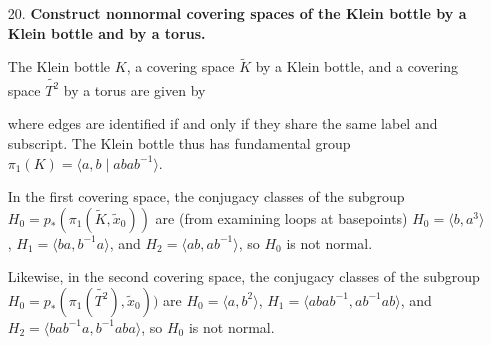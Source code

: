 \documentclass[a4paper,12pt]{article}
\begin{document}
\begin{enumerate}
    \item[20.]
        \boldmath\textbf{Construct nonnormal covering spaces of the Klein bottle by a Klein bottle and by a torus.
        }\unboldmath \par
        The Klein bottle $K$, a covering space $\tilde{K}$ by a Klein bottle, and a covering space $\tilde{T^2}$ by a torus are given by \par
        \vspace{4cm}
        where edges are identified if and only if they share the same label and subscript. The Klein bottle thus has fundamental group $\pi_1(K) = \langle a, b \mid abab^{-1} \rangle$. \par
        In the first covering space, the conjugacy classes of the subgroup $H_0 = p_*(\pi_1(\tilde{K}, \tilde{x}_0))$ are (from examining loops at basepoints) $H_0 = \langle b, a^3 \rangle$, $H_1 = \langle ba, b^{-1} a \rangle$, and $H_2 = \langle ab, ab^{-1} \rangle$, so $H_0$ is not normal. \par
        Likewise, in the second covering space, the conjugacy classes of the subgroup $H_0 = p_*(\pi_1(\tilde{T^2}), \tilde{x}_0))$ are $H_0 = \langle a, b^2 \rangle$, $H_1 = \langle abab^{-1}, ab^{-1}ab \rangle$, and $H_2 = \langle bab^{-1}a, b^{-1}aba \rangle$, so $H_0$ is not normal.
        \vspace{5cm}
\end{enumerate}
\end{document}
